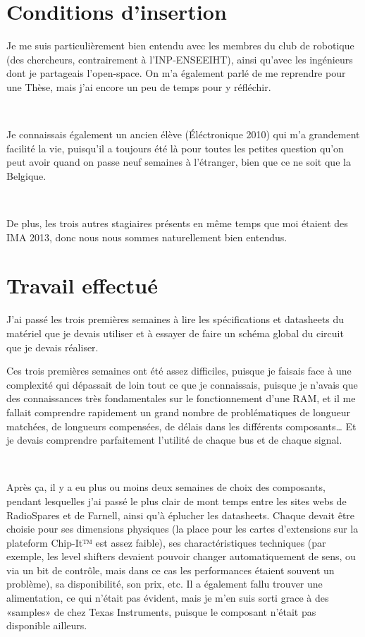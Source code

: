 \documentclass{article}
\begin{document}
\section{Conditions d’insertion}
Je me suis particulièrement bien entendu avec les membres du club de robotique (des chercheurs, contrairement à l’INP-ENSEEIHT), ainsi qu’avec les ingénieurs dont je partageais l’open-space. On m’a également parlé de me reprendre pour une Thèse, mais j’ai encore un peu de temps pour y réfléchir.

~

Je connaissais également un ancien élève (Éléctronique 2010) qui m’a grandement facilité la vie, puisqu’il a toujours été là pour toutes les petites question qu’on peut avoir quand on passe neuf semaines à l’étranger, bien que ce ne soit que la Belgique.

~

De plus, les trois autres stagiaires présents en même temps que moi étaient des IMA 2013, donc nous nous sommes naturellement bien entendus.

\section{Travail effectué}
J’ai passé les trois premières semaines à lire les spécifications et datasheets du matériel que je devais utiliser et à essayer de faire un schéma global du circuit que je devais réaliser.

Ces trois premières semaines ont été assez difficiles, puisque je faisais face à une complexité qui dépassait de loin tout ce que je connaissais, puisque je n’avais que des connaissances très fondamentales sur le fonctionnement d’une RAM, et il me fallait comprendre rapidement un grand nombre de problématiques de longueur matchées, de longueurs compensées, de délais dans les différents composants… Et je devais comprendre parfaitement l’utilité de chaque bus et de chaque signal.

~

Après ça, il y a eu plus ou moins deux semaines de choix des composants, pendant lesquelles j’ai passé le plus clair de mont temps entre les sites webs de RadioSpares et de Farnell, ainsi qu’à éplucher les datasheets. Chaque devait être choisie pour ses dimensions physiques (la place pour les cartes d’extensions sur la plateform Chip-It™ est assez faible), ses charactéristiques techniques (par exemple, les level shifters devaient pouvoir changer automatiquement de sens, ou via un bit de contrôle, mais dans ce cas les performances étaient souvent un problème), sa disponibilité, son prix, etc. Il a également fallu trouver une alimentation, ce qui n’était pas évident, mais je m’en suis sorti grace à des «samples» de chez Texas Instruments, puisque le composant n’était pas disponible ailleurs.
\end{document}

